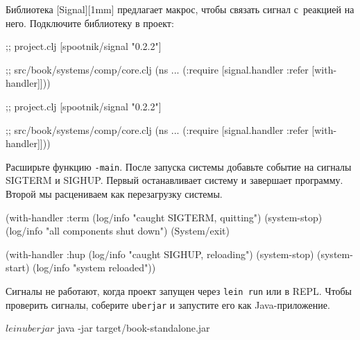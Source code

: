 
Библиотека [Signal][1mm] предлагает макрос,
чтобы связать сигнал с~реакцией на него. Подключите библиотеку в проект:

\ifx\DEVICETYPE\MOBILE

\begin{english}
  \begin{clojure}
;; project.clj
[spootnik/signal "0.2.2"]

;; src/book/systems/comp/core.clj
(ns ...
  (:require
   [signal.handler :refer
    [with-handler]]))
  \end{clojure}
\end{english}

\else

\begin{english}
  \begin{clojure}
;; project.clj
[spootnik/signal "0.2.2"]

;; src/book/systems/comp/core.clj
(ns ...
  (:require [signal.handler :refer [with-handler]]))
  \end{clojure}
\end{english}

\fi

Расширьте функцию \verb|-main|. После запуска системы добавьте событие на
сигналы SIGTERM и SIGHUP. Первый останавливает систему и завершает
программу. Второй мы расцениваем как перезагрузку системы.



\begin{english}
  \begin{clojure}
(with-handler :term
  (log/info "caught SIGTERM, quitting")
  (system-stop)
  (log/info "all components shut down")
  (System/exit)

(with-handler :hup
  (log/info "caught SIGHUP, reloading")
  (system-stop)
  (system-start)
  (log/info "system reloaded"))
  \end{clojure}
\end{english}

Сигналы не работают, когда проект запущен через \verb|lein run| или в
REPL. Чтобы проверить сигналы, соберите \verb|uberjar| и запустите его как
Java-приложение.

\begin{english}
  \begin{bash}
$ lein uberjar
$ java -jar target/book-standalone.jar
  \end{bash}
\end{english}

